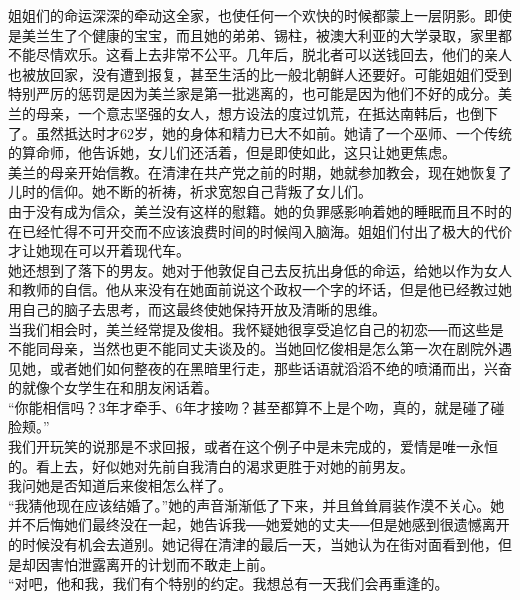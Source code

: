 姐姐们的命运深深的牵动这全家，也使任何一个欢快的时候都蒙上一层阴影。即使是美兰生了个健康的宝宝，而且她的弟弟、锡柱，被澳大利亚的大学录取，家里都不能尽情欢乐。这看上去非常不公平。几年后，脱北者可以送钱回去，他们的亲人也被放回家，没有遭到报复，甚至生活的比一般北朝鲜人还要好。可能姐姐们受到特别严厉的惩罚是因为美兰家是第一批逃离的，也可能是因为他们不好的成分。美兰的母亲，一个意志坚强的女人，想方设法的度过饥荒，在抵达南韩后，也倒下了。虽然抵达时才62岁，她的身体和精力已大不如前。她请了一个巫师、一个传统的算命师，他告诉她，女儿们还活着，但是即使如此，这只让她更焦虑。\\

美兰的母亲开始信教。在清津在共产党之前的时期，她就参加教会，现在她恢复了儿时的信仰。她不断的祈祷，祈求宽恕自己背叛了女儿们。\\

由于没有成为信众，美兰没有这样的慰籍。她的负罪感影响着她的睡眠而且不时的在已经忙得不可开交而不应该浪费时间的时候闯入脑海。姐姐们付出了极大的代价才让她现在可以开着现代车。\\

她还想到了落下的男友。她对于他敦促自己去反抗出身低的命运，给她以作为女人和教师的自信。他从来没有在她面前说这个政权一个字的坏话，但是他已经教过她用自己的脑子去思考，而这最终使她保持开放及清晰的思维。\\

当我们相会时，美兰经常提及俊相。我怀疑她很享受追忆自己的初恋──而这些是不能同母亲，当然也更不能同丈夫谈及的。当她回忆俊相是怎么第一次在剧院外遇见她，或者她们如何整夜的在黑暗里行走，那些话语就滔滔不绝的喷涌而出，兴奋的就像个女学生在和朋友闲话着。\\

“你能相信吗？3年才牵手、6年才接吻？甚至都算不上是个吻，真的，就是碰了碰脸颊。”\\

我们开玩笑的说那是不求回报，或者在这个例子中是未完成的，爱情是唯一永恒的。看上去，好似她对先前自我清白的渴求更胜于对她的前男友。\\

我问她是否知道后来俊相怎么样了。\\

“我猜他现在应该结婚了。”她的声音渐渐低了下来，并且耸耸肩装作漠不关心。她并不后悔她们最终没在一起，她告诉我──她爱她的丈夫──但是她感到很遗憾离开的时候没有机会去道别。她记得在清津的最后一天，当她认为在街对面看到他，但是却因害怕泄露离开的计划而不敢走上前。\\

“对吧，他和我，我们有个特别的约定。我想总有一天我们会再重逢的。\\

